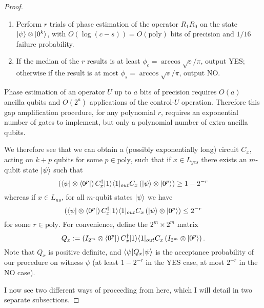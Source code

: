 \documentclass[english]{article}
\numberwithin{equation}{section}
\numberwithin{figure}{section}
\theoremstyle{plain}
\theoremstyle{definition}
\theoremstyle{plain}
\theoremstyle{definition}
\theoremstyle{remark}
\theoremstyle{remark}
\theoremstyle{plain}
\begin{document}
\begin{proof}
\begin{enumerate}
\item Perform $r$ trials of phase estimation of the operator $R_1R_0$ on the state $|\psi\rangle\otimes |0^k\rangle$, with $O(\log(c-s)) = O(\text{poly})$ bits of precision and $1/16$ failure probability. 
\item If the median of the $r$ results is at least $\phi_c = \arccos\sqrt{c}/\pi$, output YES; otherwise if the result is at most $\phi_s = \arccos\sqrt{s}/\pi$, output NO.
\end{enumerate}

Phase estimation of an operator $U$ up to $a$ bits of precision requires $O(a)$ ancilla qubits and $O(2^a)$ applications of the control-$U$ operation. Therefore this gap amplification procedure, for any polynomial $r$, requires an exponential number of gates to implement, but only a polynomial number of extra ancilla qubits.

We therefore see that we can obtain a (possibly exponentially long) circuit $C_x$, acting on $k+p$ qubits for some $p \in \text{poly}$, such that if $x \in L_{yes}$ there exists an $m$-qubit state $|\psi\rangle$ such that
\begin{equation}
\left(\langle \psi|\otimes \langle 0^p|\right) C^\dagger_x |1\rangle\langle 1|_{out} C_x \left(|\psi\rangle\otimes |0^p\rangle\right) \ge 1-2^{-r}
\end{equation}
whereas if $x \in L_{no}$, for all $m$-qubit states $|\psi\rangle$ we have
\begin{equation}
\left(\langle \psi|\otimes \langle 0^p|\right) C^\dagger_x |1\rangle\langle 1|_{out} C_x \left(|\psi\rangle\otimes |0^p\rangle\right) \le 2^{-r}
\end{equation}
for some $r \in \text{poly}$. For convenience, define the $2^m \times 2^m$ matrix
\begin{equation}
Q_x := \left(I_{2^m}\otimes \langle 0^p|\right) C^\dagger_x |1\rangle\langle 1|_{out} C_x \left(I_{2^m}\otimes |0^p\rangle\right).
\end{equation}
Note that $Q_x$ is positive definite, and $\langle \psi|Q_x|\psi\rangle$ is the acceptance probability of our procedure on witness $\psi$ (at least $1-2^{-r}$ in the YES case, at most $2^{-r}$ in the NO case).

I now see two different ways of proceeding from here, which I will detail in two separate subsections.


\end{proof}
\end{document}
